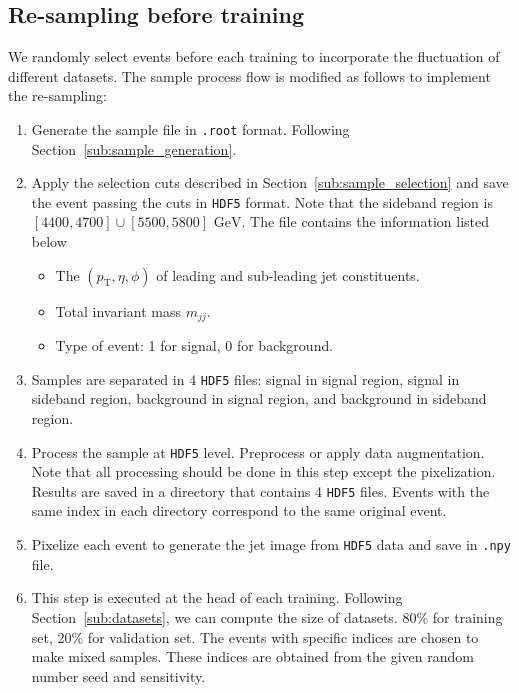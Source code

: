 \documentclass[12pt]{article}
\begin{document}
	\subsection{Re-sampling before training}%
	\label{sub:re_sampling_before_training}
		We randomly select events before each training to incorporate the fluctuation of different datasets. The sample process flow is modified as follows to implement the re-sampling:
		\begin{enumerate}
			\item Generate the sample file in \verb|.root| format. Following Section~\ref{sub:sample_generation}.
			\item Apply the selection cuts described in Section~\ref{sub:sample_selection} and save the event passing the cuts in \verb|HDF5| format. Note that the sideband region is $[4400,4700] \cup [5500,5800] \text{ GeV}$. The file contains the information listed below 
				\begin{itemize}
					\item The $\left( p_{\text{T}}, \eta, \phi \right) $ of leading and sub-leading jet constituents.
					\item Total invariant mass $m_{jj}$.
					\item Type of event: 1 for signal, 0 for background.	
				\end{itemize}
			\item Samples are separated in 4 \verb|HDF5| files: signal in signal region, signal in sideband region, background in signal region, and background in sideband region.
			\item Process the sample at \verb|HDF5| level. Preprocess or apply data augmentation. Note that all processing should be done in this step except the pixelization. Results are saved in a directory that contains 4 \verb|HDF5| files. Events with the same index in each directory correspond to the same original event.
			\item Pixelize each event to generate the jet image from \verb|HDF5| data and save in \verb|.npy| file.
			\item This step is executed at the head of each training. Following Section~\ref{sub:datasets}, we can compute the size of datasets. 80\% for training set, 20\% for validation set. The events with specific indices are chosen to make mixed samples. These indices are obtained from the given random number seed and sensitivity.


\end{enumerate}
\end{document}
